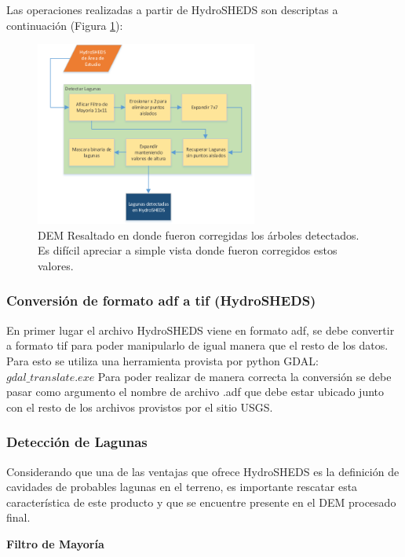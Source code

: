 \documentclass[10pt,a4paper, twoside]{report}
\begin{document}
Las operaciones realizadas a partir de HydroSHEDS son descriptas a continuación (Figura \ref{DiagramaLagunas}):

\begin{figure}[H]
   \centering      
   \includegraphics[width=0.65\textwidth]{imagenes/DiagramaLagunas.pdf}
 \caption{DEM Resaltado en donde fueron corregidas los árboles detectados. Es difícil apreciar a simple vista donde fueron corregidos estos valores.}
 \label{DiagramaLagunas}
\end{figure}

\subsubsection{Conversión de formato adf a tif (HydroSHEDS)}

En primer lugar el archivo HydroSHEDS viene en formato adf, se debe convertir a formato tif para poder manipularlo de igual manera que el resto de los datos. Para esto se utiliza una herramienta provista por python GDAL: $gdal\_translate.exe$
Para poder realizar de manera correcta la conversión se debe pasar como argumento el nombre de archivo .adf que debe estar ubicado junto con el resto de los archivos provistos por el sitio USGS.

\subsubsection{Detección de Lagunas}
\label{deteccionLagunas}

 Considerando que una de las ventajas que ofrece HydroSHEDS es la definición de cavidades de probables lagunas en el terreno, es importante rescatar esta característica de este producto y que se encuentre presente en el DEM procesado final.

\textbf{Filtro de Mayoría}
\end{document}
